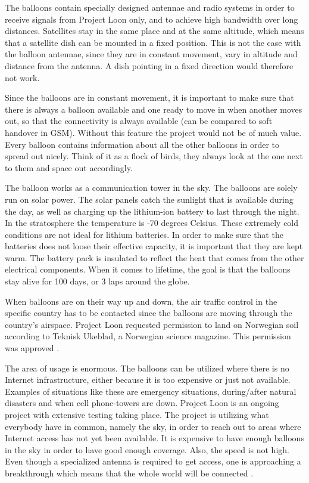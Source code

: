 The balloons contain specially designed antennae and radio systems in order to receive signals from Project Loon only, and to achieve high bandwidth over long distances. Satellites stay in the same place and at the same altitude, which means that a satellite dish can be mounted in a fixed position. This is not the case with the balloon antennae, since they are in constant movement, vary in altitude and distance from the antenna. A dish pointing in a fixed direction would therefore not work.

Since the balloons are in constant movement, it is important to make sure that there is always a balloon available and one ready to move in when another moves out, so that the connectivity is always available (can be compared to soft handover in GSM). Without this feature the project would not be of much value. Every balloon contains information about all the other balloons in order to spread out nicely. Think of it as a flock of birds, they always look at the one next to them and space out accordingly.

The balloon works as a communication tower in the sky. The balloons are solely run on solar power. The solar panels catch the sunlight that is available during the day, as well as charging up the lithium-ion battery to last through the night. In the stratosphere the temperature is -70 degrees Celsius. These extremely cold conditions are not ideal for lithium batteries. In order to make sure that the batteries does not loose their effective capacity, it is important that they are kept warm. The battery pack is insulated to reflect the heat that comes from the other electrical components. When it comes to lifetime, the goal is that the balloons stay alive for 100 days, or 3 laps around the globe. 

When balloons are on their way up and down, the air traffic control in the specific country has to be contacted since the balloons are moving through the country's airspace. Project Loon requested permission to land on Norwegian soil according to Teknisk Ukeblad, a Norwegian science magazine. This permission was approved \cite{loonTU}.

The area of usage is enormous. The balloons can be utilized where there is no Internet infrastructure, either because it is too expensive or just not available. Examples of situations like these are emergency situations, during/after natural disasters and when cell phone-towers are down. Project Loon is an ongoing project with extensive testing taking place. The project is utilizing what everybody have in common, namely the sky, in order to reach out to areas where Internet access has not yet been available. It is expensive to have enough balloons in the sky in order to have good enough coverage. Also, the speed is not high. Even though a specialized antenna is required to get access, one is approaching a breakthrough which means that the whole world will be connected \cite{loonYouTube, loonNorsk}.

